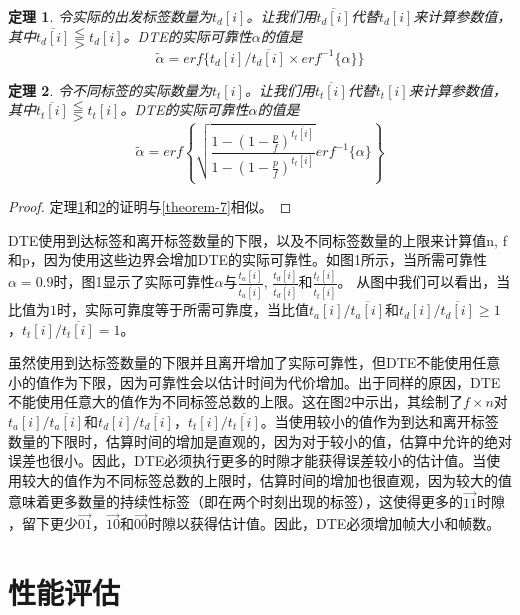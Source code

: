 \documentclass[UTF8]{ctexart}
\newtheorem{theorem}{定理}
\newtheorem*{proof}{证明}
\begin{document}
	\begin{theorem}\label{theorem-8}
		\emph{令实际的出发标签数量为$t_d[i]$。让我们用$\overline{t_d[i]}$代替$t_d[i]$来计算参数值，其中$\overline{t_d[i]}\lesseqqgtr t_d[i]$。DTE的实际可靠性$\alpha$的值是}
		\begin{equation}
		\tilde{\alpha} = erf\{t_d[i]/\overline{t_d[i]}\times erf^{-1}\{\alpha\}\}
		\end{equation}
	\end{theorem}
	
	\begin{theorem}\label{theorem-9}
		\emph{令不同标签的实际数量为$t_t[i]$。让我们用$\overline{t_t[i]}$代替$t_t[i]$来计算参数值，其中$\overline{t_t[i]}\lesseqqgtr t_t[i]$。DTE的实际可靠性$\alpha$的值是}
		\begin{equation}
		\tilde{\alpha} = erf\left\{\sqrt{\frac{1-(1-\frac{p}{f})^{\overline{t_t[i]}}}{1-(1-\frac{p}{f})^{t_t[i]}}}erf^{-1}\{\alpha\}\right\}
		\end{equation}
	\end{theorem}
	\begin{proof}
		定理\ref{theorem-8}和\ref{theorem-9}的证明与\ref{theorem-7}相似。
	\end{proof}
	
	DTE使用到达标签和离开标签数量的下限，以及不同标签数量的上限来计算值n, f和p，因为使用这些边界会增加DTE的实际可靠性。如图1所示，当所需可靠性$\alpha=0.9$时，图1显示了实际可靠性$\alpha$与$\frac{t_a[i]}{\overline{t_a[i]}}$, $\frac{t_d[i]}{\overline{t_d[i]}}$和$\frac{t_t[i]}{\overline{t_t[i]}}$。 从图中我们可以看出，当比值为$1$时，实际可靠度等于所需可靠度，当比值$t_a[i]/\overline{t_a[i]}$和$t_d[i]/\overline{t_d[i]}\geq 1$，$t_t[i]/\overline{t_t[i]}=1$。
	
	虽然使用到达标签数量的下限并且离开增加了实际可靠性，但DTE不能使用任意小的值作为下限，因为可靠性会以估计时间为代价增加。出于同样的原因，DTE不能使用任意大的值作为不同标签总数的上限。这在图2中示出，其绘制了$f\times n$对$t_a[i]/\overline{t_a[i]}$和$t_d[i]/\overline{t_d[i]}$，$t_t[i]/\overline{t_t[i]}$。当使用较小的值作为到达和离开标签数量的下限时，估算时间的增加是直观的，因为对于较小的值，估算中允许的绝对误差也很小。因此，DTE必须执行更多的时隙才能获得误差较小的估计值。当使用较大的值作为不同标签总数的上限时，估算时间的增加也很直观，因为较大的值意味着更多数量的持续性标签（即在两个时刻出现的标签），这使得更多的$\vec{11}$时隙 ，留下更少$\vec{01}$，$\vec{10}$和$\vec{00}$时隙以获得估计值。因此，DTE必须增加帧大小和帧数。
	
	\section{性能评估}
	
\end{document}
